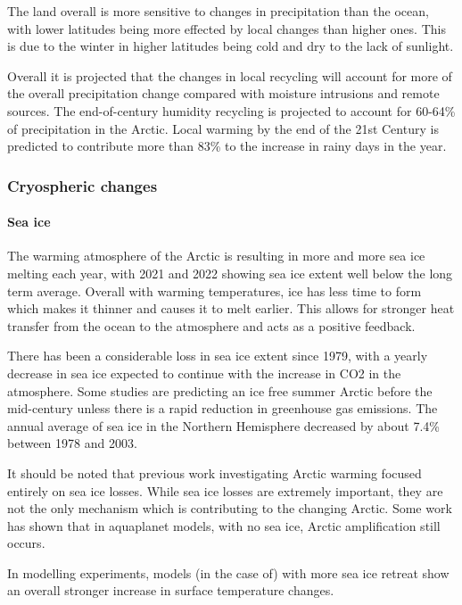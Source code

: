 \documentclass[12pt, oneside]{article}
\begin{document}
The land overall is more sensitive to changes in precipitation than the ocean, with lower latitudes being more effected by local changes than higher ones. This is due to the winter in higher latitudes being cold and dry to the lack of sunlight. 


Overall it is projected that the changes in local recycling will account for more of the overall precipitation change compared with moisture intrusions and remote sources. The end-of-century humidity recycling is projected to account for 60-64\% of precipitation in the Arctic\cite{ford2022arctic}. Local warming by the end of the 21st Century is predicted to contribute more than 83\% to the increase in rainy days in the year\cite{dou2022more}.


\subsubsection{Cryospheric changes}


\paragraph{Sea ice}
The warming atmosphere of the Arctic is resulting in more and more sea ice melting each year, with 2021 and 2022 showing sea ice extent well below the long term average\cite{druckenmiller2022arctic}. Overall with warming temperatures, ice has less time to form which makes it thinner and causes it to melt earlier. This allows for stronger heat transfer from the ocean to the atmosphere and acts as a positive feedback. 

There has been a considerable loss in sea ice extent since 1979, with a yearly decrease in sea ice expected to continue with the increase in CO2 in the atmosphere\cite{dai2019arctic}. Some studies are predicting an ice free summer Arctic before the mid-century unless there is a rapid reduction in greenhouse gas emissions\cite{notz2018trajectory}. The annual average of sea ice in the Northern Hemisphere decreased by about 7.4\% between 1978 and 2003. 

It should be noted that previous work investigating Arctic warming focused entirely on sea ice losses\cite{serreze2009emergence}. While sea ice losses are extremely important, they are not the only mechanism which is contributing to the changing Arctic. Some work has shown that in aquaplanet models, with no sea ice, Arctic amplification still occurs\cite{russotto2020polar}.

In modelling experiments, models (in the case of\cite{bintanja2014future}) with more sea ice retreat show an overall stronger increase in surface temperature changes. 
\end{document}
